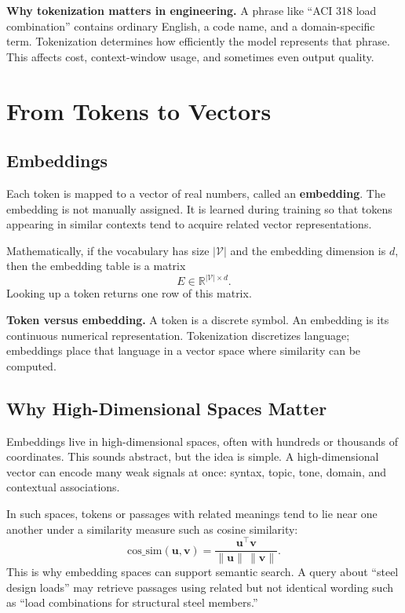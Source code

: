 \documentclass[12pt]{article}
\begin{document}
\begin{ex-box}
\textbf{Why tokenization matters in engineering.} A phrase like ``ACI 318 load combination'' contains ordinary English, a code name, and a domain-specific term. Tokenization determines how efficiently the model represents that phrase. This affects cost, context-window usage, and sometimes even output quality.
\end{ex-box}

\section{From Tokens to Vectors}

\subsection{Embeddings}

Each token is mapped to a vector of real numbers, called an \textbf{embedding}. The embedding is not manually assigned. It is learned during training so that tokens appearing in similar contexts tend to acquire related vector representations.

Mathematically, if the vocabulary has size $|\mathcal{V}|$ and the embedding dimension is $d$, then the embedding table is a matrix
\begin{equation}
    E \in \mathbb{R}^{|\mathcal{V}| \times d}.
    \label{t15eq:embedding_matrix}
\end{equation}
Looking up a token returns one row of this matrix.

\begin{def-box}
\textbf{Token versus embedding.} A token is a discrete symbol. An embedding is its continuous numerical representation. Tokenization discretizes language; embeddings place that language in a vector space where similarity can be computed.
\end{def-box}

\subsection{Why High-Dimensional Spaces Matter}

Embeddings live in high-dimensional spaces, often with hundreds or thousands of coordinates. This sounds abstract, but the idea is simple. A high-dimensional vector can encode many weak signals at once: syntax, topic, tone, domain, and contextual associations.

In such spaces, tokens or passages with related meanings tend to lie near one another under a similarity measure such as cosine similarity:
\begin{equation}
    \mathrm{cos\_sim}(\mathbf{u},\mathbf{v}) = \frac{\mathbf{u}^\top \mathbf{v}}{\|\mathbf{u}\|\,\|\mathbf{v}\|}.
    \label{t15eq:cosine}
\end{equation}
This is why embedding spaces can support semantic search. A query about ``steel design loads'' may retrieve passages using related but not identical wording such as ``load combinations for structural steel members.''
\end{document}
